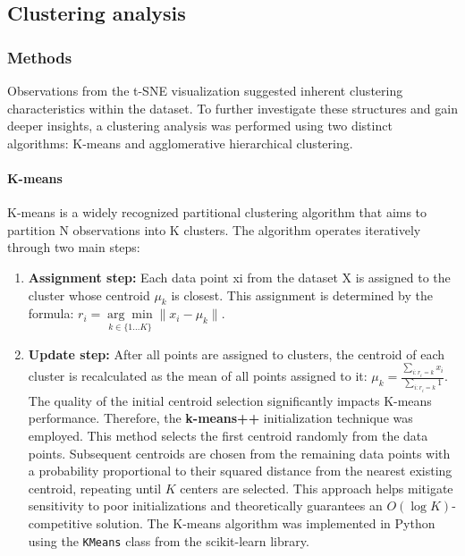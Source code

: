 \documentclass{article}
\begin{document}
\subsection{Clustering analysis}





\subsubsection*{Methods}

Observations from the t-SNE visualization suggested inherent clustering characteristics within the dataset. To further investigate these structures and gain deeper insights, a clustering analysis was performed using two distinct algorithms: K-means and agglomerative hierarchical clustering.

\paragraph{K-means} K-means is a widely recognized partitional clustering algorithm that aims to partition N observations into K clusters. The algorithm operates iteratively through two main steps:

\begin{enumerate}
    \item \textbf{Assignment step:} Each data point xi from the dataset X is assigned to the cluster whose centroid $\mu_k$ is closest. This assignment is determined by the formula: $r_i = \underset{k\in \{1\ldots K\} }{\arg\min}{ \|x_{i}-\mu_k\| }$.
    \item \textbf{Update step:} After all points are assigned to clusters, the centroid of each cluster is recalculated as the mean of all points assigned to it: $\mu_k = \frac{\sum_{i:r_i=k}^{} x_i}{\sum_{i:r_i=k}^{} 1}$. The quality of the initial centroid selection significantly impacts K-means performance. Therefore, the \textbf{k-means++} initialization technique was employed. This method selects the first centroid randomly from the data points. Subsequent centroids are chosen from the remaining data points with a probability proportional to their squared distance from the nearest existing centroid, repeating until $K$ centers are selected. This approach helps mitigate sensitivity to poor initializations and theoretically guarantees an $O(\log K)$-competitive solution. The K-means algorithm was implemented in Python using the \texttt{KMeans} class from the scikit-learn library.
\end{enumerate}
\end{document}
